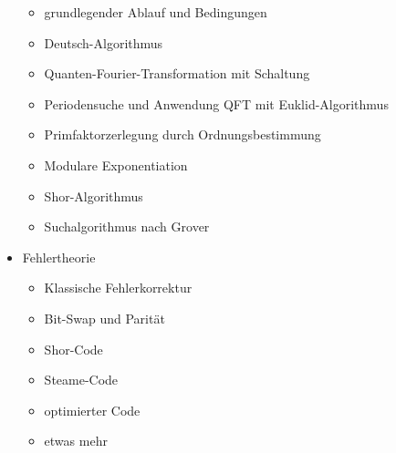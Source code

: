 \documentclass[9pt]{article}
\begin{document}
\begin{multicols}{2}
\begin{itemize}
\begin{itemize}
          \item grundlegender Ablauf und Bedingungen
          \item Deutsch-Algorithmus
          \item Quanten-Fourier-Transformation mit Schaltung
          \item Periodensuche und Anwendung QFT mit Euklid-Algorithmus
          \item Primfaktorzerlegung durch Ordnungsbestimmung
          \item Modulare Exponentiation
          \item Shor-Algorithmus
          \item Suchalgorithmus nach Grover
        \end{itemize}
      \item Fehlertheorie
        \begin{itemize}
          \item Klassische Fehlerkorrektur
          \item Bit-Swap und Parität
          \item Shor-Code
          \item Steame-Code
          \item optimierter Code
          \item etwas mehr
        \end{itemize}
    \end{itemize}
  \end{multicols}
\end{document}
